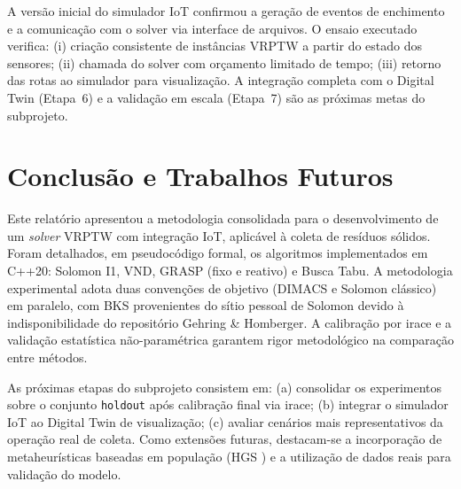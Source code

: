 \documentclass[10pt, a4paper]{article}
\begin{document}
A vers\~ao inicial do simulador IoT confirmou a gera\c{c}\~ao de eventos de enchimento e a comunica\c{c}\~ao com o solver via interface de arquivos. O ensaio executado verifica: (i) cria\c{c}\~ao consistente de inst\^ancias VRPTW a partir do estado dos sensores; (ii) chamada do solver com or\c{c}amento limitado de tempo; (iii) retorno das rotas ao simulador para visualiza\c{c}\~ao. A integra\c{c}\~ao completa com o Digital Twin (Etapa~6) e a valida\c{c}\~ao em escala (Etapa~7) s\~ao as pr\'oximas metas do subprojeto.

\section{Conclus\~ao e Trabalhos Futuros}
\label{sec-conclusao}

Este relatório apresentou a metodologia consolidada para o desenvolvimento de um \emph{solver} VRPTW com integra\c{c}\~ao IoT, aplic\'avel \`a coleta de res\'iduos s\'olidos. Foram detalhados, em pseudoc\'odigo formal, os algoritmos implementados em C++20: Solomon I1, VND, GRASP (fixo e reativo) e Busca Tabu. A metodologia experimental adota duas conven\c{c}\~oes de objetivo (DIMACS e Solomon cl\'assico) em paralelo, com BKS provenientes do s\'itio pessoal de Solomon devido \`a indisponibilidade do reposit\'orio Gehring \& Homberger. A calibra\c{c}\~ao por irace e a valida\c{c}\~ao estat\'istica n\~ao-param\'etrica garantem rigor metodol\'ogico na compara\c{c}\~ao entre m\'etodos.

As pr\'oximas etapas do subprojeto consistem em: (a) consolidar os experimentos sobre o conjunto \texttt{holdout} ap\'os calibra\c{c}\~ao final via irace; (b) integrar o simulador IoT ao Digital Twin de visualiza\c{c}\~ao; (c) avaliar cen\'arios mais representativos da opera\c{c}\~ao real de coleta. Como extens\~oes futuras, destacam-se a incorpora\c{c}\~ao de metaheur\'isticas baseadas em popula\c{c}\~ao (HGS \citep{vidal2013}) e a utiliza\c{c}\~ao de dados reais para valida\c{c}\~ao do modelo.


\renewcommand{\bibsection}{\section*{Refer\^encias}}

\end{document}
